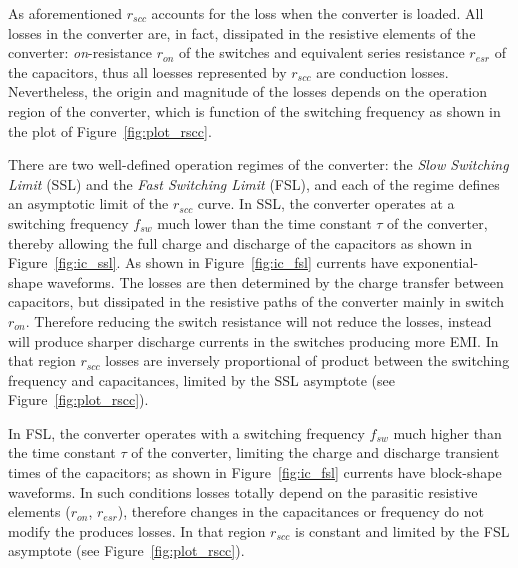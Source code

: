 As aforementioned $r_{scc}$ accounts for the loss when the converter is loaded. All losses in the converter are, in fact, dissipated in the resistive elements of the converter: \emph{on}-resistance $r_{on}$ of the switches and equivalent series resistance $r_{esr}$ of the capacitors, thus all loesses represented by $r_{scc}$ are conduction losses. Nevertheless, the origin and magnitude of the losses depends on the operation region of the converter, which is function of the switching frequency as shown in the plot of Figure~\ref{fig:plot_rscc}.

There are two well-defined operation regimes of the converter: the \emph{Slow Switching Limit} (SSL) and the \emph{Fast Switching Limit} (FSL), and each of the regime defines an asymptotic limit of the $r_{scc}$ curve. In SSL, the converter operates at a switching frequency $f_{sw}$ much lower than the time constant $\tau$ of the converter, thereby allowing the full charge and discharge of the capacitors as shown in Figure~\ref{fig:ic_ssl}. As shown in Figure~\ref{fig:ic_fsl} currents have exponential-shape waveforms. The losses are then determined by the charge transfer between capacitors, but dissipated in the resistive paths of the converter mainly in switch $r_{on}$. Therefore reducing the switch resistance will not reduce the losses, instead will produce sharper discharge currents in the switches producing more EMI. In that region $r_{scc}$ losses are inversely proportional of product between the switching frequency and capacitances, limited by the SSL asymptote (see Figure~\ref{fig:plot_rscc}).

In FSL, the converter operates with a switching frequency $f_{sw}$ much higher than the time constant $\tau$ of the converter, limiting the charge and discharge transient times of the capacitors; as shown in Figure~\ref{fig:ic_fsl} currents have block-shape waveforms. In such conditions losses totally depend on the parasitic resistive elements ($r_{on}$, $r_{esr}$), therefore changes in the capacitances or frequency do not modify the produces losses. In that region $r_{scc}$ is constant and limited by the FSL asymptote (see Figure~\ref{fig:plot_rscc}).

